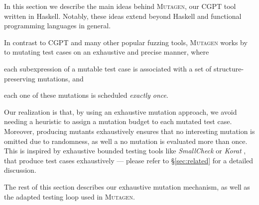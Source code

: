\documentclass[sigconf, anonymous, review]{acmart}
\newcommand{\mutagen}{\textsc{Mutagen}\xspace}
\begin{document}
In this section we describe the main ideas behind \mutagen, our CGPT tool
written in Haskell.
%
Notably, these ideas extend beyond Haskell and functional programming languages
in general.
%

In contrast to CGPT and many other popular fuzzing tools, \mutagen works by to
mutating test cases on an exhaustive and precise manner, where
%
\begin{inparaenum}
  \item each subexpression of a mutable test case is associated with a set of
    structure-preserving mutations, and
  \item each one of these mutations is scheduled \emph{exactly once}.
\end{inparaenum}
%
%
Our realization is that, by using an exhaustive mutation approach, we avoid
needing a heuristic to assign a mutation budget to each mutated test case.
%
Moreover, producing mutants exhaustively ensures that no interesting mutation is
omitted due to randomness, as well a no mutation is evaluated more than once.
%
This is inspired by exhaustive bounded testing tools like \emph{SmallCheck}
\cite{runciman2008smallcheck} or \emph{Korat} \cite{boyapati2002korat}, that
produce test cases exhaustively --- please refer to \S \ref{sec:related}
for a detailed discussion.


The rest of this section describes our exhaustive mutation mechanism, as well as
the adapted testing loop used in \mutagen.


\end{document}
